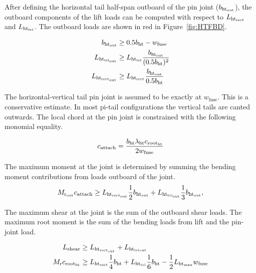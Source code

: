After defining the horizontal tail half-span outboard of the pin joint 
($b_{\rm{ht}_{\rm{out}}}$), the outboard components of the lift loads   can be computed 
with respect to $L_{\rm{ht}_{rect}}$ and $L_{\rm{ht}_{\rm{tri}}}$. The outboard loads are shown 
in red in Figure~\ref{fig:HTFBD}. 
 
 \begin{align}
     b_{\rm{ht}_{\rm{out}}} &\geq 0.5b_{\rm{ht}} - w_{\textrm{fuse}}\\
     L_{\rm{ht}_{tri_{\rm{out}}}} &\geq L_{\rm{ht}_{\rm{tri}}} \frac{b_{\rm{ht}_{\rm{out}}}}{(0.5b_{\rm{ht}})^2}\\
     L_{\rm{ht}_{\rm{rect}_{\rm{out}}}} &\geq L_{\rm{ht}_{rect}} \frac{b_{\rm{ht}_{\rm{out}}}}{0.5b_{\rm{ht}}}
 \end{align}
 
The horizontal-vertical tail pin joint is assumed to be exactly at $w_{\textrm{fuse}}$. 
This is a conservative estimate. In most pi-tail configurations the vertical 
tails are canted outwards. The local chord at the pin joint is constrained with 
the following monomial equality.
 
\begin{equation}
    c_{\rm{attach}} = \frac{b_{\rm{ht}} \lambda_{\rm{ht}} c_{\rm{root}_{\rm{ht}}}}{2 w_{\textrm{fuse}}}
\end{equation}
 
The maximum moment at the joint is determined by summing the bending moment 
contributions from loads outboard of the joint. 
\begin{equation}
M_{\rm{r}_{\rm{out}}} c_{\rm{attach}} \geq 
                    L_{\rm{ht}_{\rm{rect}_{\rm{out}}}} \frac{1}{2}b_{\rm{ht}_{\rm{out}}} + 
L_{\rm{ht}_{tri_{\rm{out}}}} \frac{1}{3}b_{\rm{ht}_{\rm{out}}},
\end{equation}
 
The maximum shear at the joint is the sum of the outboard shear loads. The 
maximum root moment is the sum of the bending loads from lift and the pin-joint 
load. 
 
\begin{align}
L_{\rm{shear}} &\geq L_{\rm{ht}_{\rm{rect}_{\rm{out}}}} + L_{\rm{ht}_{tri{\rm{out}}}}\\
M_{\rm{r}} c_{\rm{root}_{\rm{ht}}} &\geq L_{\rm{ht}_{\rm{rect}}} \frac{1}{4}b_{\rm{ht}} + L_{\rm{ht}_{\rm{\rm{tri}}}} 
\frac{1}{6}b_{\rm{ht}}  - \frac{1}{2}L_{\rm{ht}_{\rm{max}}} w_{\textrm{fuse}} 
\end{align}

